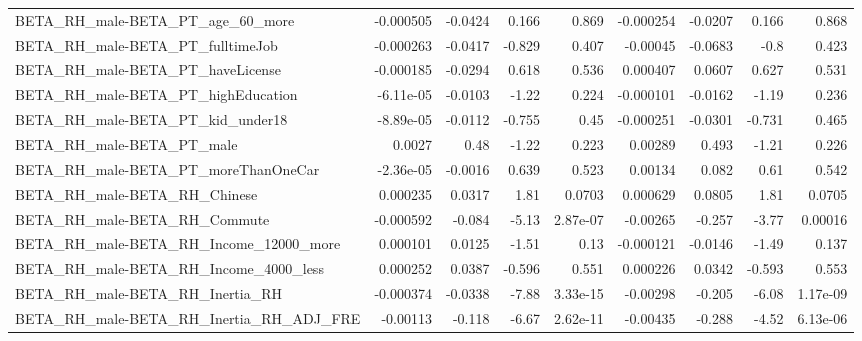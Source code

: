 \begin{tabular}{lrrrrrrrr}
BETA\_RH\_male-BETA\_PT\_age\_60\_more                   &   -0.000505 &      -0.0424 &    0.166 &    0.869 &  -0.000254 &     -0.0207 &        0.166 &         0.868 \\
BETA\_RH\_male-BETA\_PT\_fulltimeJob                   &   -0.000263 &      -0.0417 &   -0.829 &    0.407 &   -0.00045 &     -0.0683 &         -0.8 &         0.423 \\
BETA\_RH\_male-BETA\_PT\_haveLicense                   &   -0.000185 &      -0.0294 &    0.618 &    0.536 &   0.000407 &      0.0607 &        0.627 &         0.531 \\
BETA\_RH\_male-BETA\_PT\_highEducation                 &   -6.11e-05 &      -0.0103 &    -1.22 &    0.224 &  -0.000101 &     -0.0162 &        -1.19 &         0.236 \\
BETA\_RH\_male-BETA\_PT\_kid\_under18                   &   -8.89e-05 &      -0.0112 &   -0.755 &     0.45 &  -0.000251 &     -0.0301 &       -0.731 &         0.465 \\
BETA\_RH\_male-BETA\_PT\_male                          &      0.0027 &         0.48 &    -1.22 &    0.223 &    0.00289 &       0.493 &        -1.21 &         0.226 \\
BETA\_RH\_male-BETA\_PT\_moreThanOneCar                &   -2.36e-05 &      -0.0016 &    0.639 &    0.523 &    0.00134 &       0.082 &         0.61 &         0.542 \\
BETA\_RH\_male-BETA\_RH\_Chinese                       &    0.000235 &       0.0317 &     1.81 &   0.0703 &   0.000629 &      0.0805 &         1.81 &        0.0705 \\
BETA\_RH\_male-BETA\_RH\_Commute                       &   -0.000592 &       -0.084 &    -5.13 & 2.87e-07 &   -0.00265 &      -0.257 &        -3.77 &       0.00016 \\
BETA\_RH\_male-BETA\_RH\_Income\_12000\_more             &    0.000101 &       0.0125 &    -1.51 &     0.13 &  -0.000121 &     -0.0146 &        -1.49 &         0.137 \\
BETA\_RH\_male-BETA\_RH\_Income\_4000\_less              &    0.000252 &       0.0387 &   -0.596 &    0.551 &   0.000226 &      0.0342 &       -0.593 &         0.553 \\
BETA\_RH\_male-BETA\_RH\_Inertia\_RH                    &   -0.000374 &      -0.0338 &    -7.88 & 3.33e-15 &   -0.00298 &      -0.205 &        -6.08 &      1.17e-09 \\
BETA\_RH\_male-BETA\_RH\_Inertia\_RH\_ADJ\_FRE            &    -0.00113 &       -0.118 &    -6.67 & 2.62e-11 &   -0.00435 &      -0.288 &        -4.52 &      6.13e-06 \\

\end{tabular}
